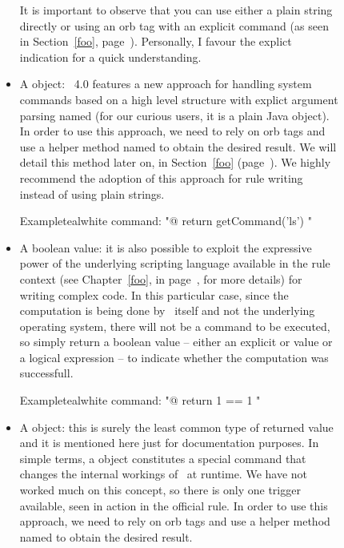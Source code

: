 \begin{description}
\begin{description}
\begin{itemize}[label={--}]
It is important to observe that you can use either a plain string directly or using an orb tag with an explicit  command (as seen in Section~\ref{foo}, page~\pageref{foo}). Personally, I favour the explict indication for a quick understanding.

\item A  object: \arara\ 4.0 features a new approach for handling system commands based on a high level structure with explict argument parsing named  (for our curious users, it is a plain Java object). In order to use this approach, we need to rely on orb tags and use a helper method named  to obtain the desired result. We will detail this method later on, in Section~\ref{foo} (page~\pageref{foo}). We highly recommend the adoption of this approach for rule writing instead of using plain strings.

\begin{codebox}{Example}{teal}{\icnote}{white}
command: "@{ return getCommand('ls') }"
\end{codebox}

\item A boolean value: it is also possible to exploit the expressive power of the underlying scripting language available in the rule context (see Chapter~\ref{foo}, in page~\pageref{foo}, for more details) for writing complex code. In this particular case, since the computation is being done by \arara\ itself and not the underlying operating system, there will not be a command to be executed, so simply return a boolean value -- either an explicit  or  value or a logical expression -- to indicate whether the computation was successfull.

\begin{codebox}{Example}{teal}{\icnote}{white}
command: "@{ return 1 == 1 }"
\end{codebox}

\item A  object: this is surely the least common type of returned value and it is mentioned here just for documentation purposes. In simple terms, a  object constitutes a special command that changes the internal workings of \arara\ at runtime. We have not worked much on this concept, so there is only one trigger available, seen in action in the official  rule. In order to use this approach, we need to rely on orb tags and use a helper method named  to obtain the desired result.
\end{itemize}


\end{description}
\end{description}
